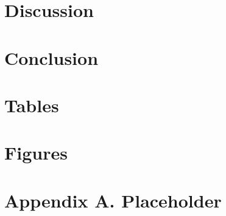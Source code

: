 \documentclass[12pt]{article}
\makeatletter
\let\estinput= define a new input command so that we can still flatten the document
\newcommand{\estwide}[3]{
\vspace{.75ex}{
\textsymbols
\begin{tabular*}
{\textwidth}{@{\hskip\tabcolsep\extracolsep\fill}l*{#2}{#3}}
\toprule
\estinput{#1}
\bottomrule
\addlinespace[.75ex]
\end{tabular*}
}
}
\makeatother
\begin{document}


\clearpage
\section{Discussion} \label{sec:discussion}

\clearpage
\section{Conclusion} \label{sec:conclusion}



\clearpage
\singlespacing
\setlength\bibsep{0pt}





\clearpage
\onehalfspacing
\section*{Tables} \label{sec:tab}



\clearpage

\section*{Figures} \label{sec:fig}



\clearpage

\section*{Appendix A. Placeholder} \label{sec:appendixa}
\end{document}
